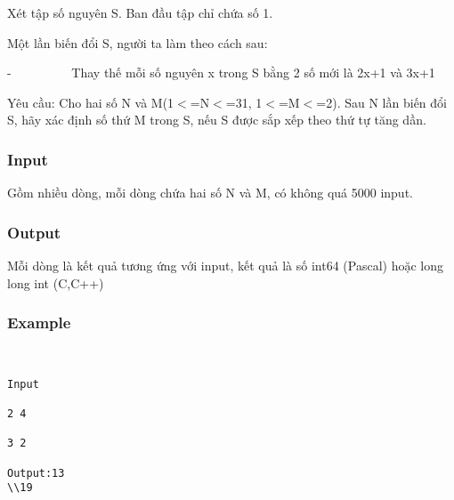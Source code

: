 



   Xét tập số nguyên S. Ban đầu tập chỉ chứa số 1.  

   Một lần biến đổi S, người ta làm theo cách sau:  

   -          Thay thế mỗi số nguyên x trong S bằng 2 số mới là 2x+1 và 3x+1  

   Yêu cầu: Cho hai số N và M(1$<$=N$<$=31, 1$<$=M$<$=2\textasciicircumN). Sau N lần biến đổi S, hãy xác định số thứ M trong S, nếu S được sắp xếp theo thứ tự tăng dần.  

\subsubsection{   Input  }

   Gồm nhiều dòng, mỗi dòng chứa hai số N và M, có không quá 5000 input.  

\subsubsection{   Output  }

   Mỗi dòng là kết quả tương ứng với input, kết quả là số int64 (Pascal) hoặc long long int (C,C++)  

\subsubsection{   Example  }
\begin{verbatim}


Input

2 4

3 2

Output:13
\\19\end{verbatim}